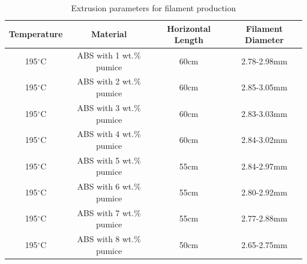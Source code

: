 \begin{table}[htbp]
\centering
\caption{Extrusion parameters for filament production}
\begin{tabular}{c c c c}
\hline
\textbf{Temperature} & \textbf{Material} & \textbf{Horizontal Length} & \textbf{Filament Diameter}\\
\hline
195$^{\circ}$C & ABS with 1 wt.$\%$ pumice & 60cm & 2.78-2.98mm \\
195$^{\circ}$C & ABS with 2 wt.$\%$ pumice & 60cm & 2.85-3.05mm \\
195$^{\circ}$C & ABS with 3 wt.$\%$ pumice & 60cm & 2.83-3.03mm \\
195$^{\circ}$C & ABS with 4 wt.$\%$ pumice & 60cm & 2.84-3.02mm \\
195$^{\circ}$C & ABS with 5 wt.$\%$ pumice & 55cm & 2.84-2.97mm \\
195$^{\circ}$C & ABS with 6 wt.$\%$ pumice & 55cm & 2.80-2.92mm \\
195$^{\circ}$C & ABS with 7 wt.$\%$ pumice & 55cm & 2.77-2.88mm \\
195$^{\circ}$C & ABS with 8 wt.$\%$ pumice & 50cm & 2.65-2.75mm \\
\hline
\end{tabular}
\label{tab:filament}
\end{table}
